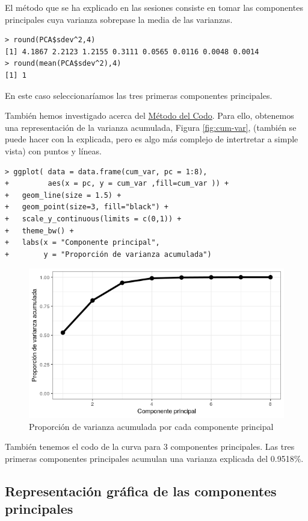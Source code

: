 \documentclass[12pt]{article}
\begin{document}
El método que se ha explicado en las sesiones consiste en tomar las
componentes principales cuya varianza sobrepase la media de las
varianzas.
\begin{verbatim}
> round(PCA$sdev^2,4)
[1] 4.1867 2.2123 1.2155 0.3111 0.0565 0.0116 0.0048 0.0014
> round(mean(PCA$sdev^2),4)
[1] 1
\end{verbatim}
En este caso seleccionaríamos las tres primeras componentes principales.

También hemos investigado acerca del
\href{https://en.wikipedia.org/wiki/Elbow_method_%28clustering%29}
  {Método del Codo}.
  Para ello, obtenemos una representación de la varianza acumulada,
  Figura \ref{fig:cum-var}, (también se puede hacer con la explicada,
  pero es algo más complejo de intertretar a simple vista) con puntos
  y líneas.
  \begin{verbatim}
> ggplot( data = data.frame(cum_var, pc = 1:8),
+         aes(x = pc, y = cum_var ,fill=cum_var )) +
+   geom_line(size = 1.5) +
+   geom_point(size=3, fill="black") +
+   scale_y_continuous(limits = c(0,1)) +
+   theme_bw() +
+   labs(x = "Componente principal",
+        y = "Proporción de varianza acumulada")
\end{verbatim}

\begin{figure}[H]
  \centering
  \includegraphics[width=120mm]{imgs/elbow}
  \caption{Proporción de varianza acumulada por cada componente principal}
  \label{fig:elbow}
\end{figure}

También tenemos el codo de la curva para 3 componentes
principales. Las tres primeras componentes principales acumulan una
varianza explicada del 0.9518\%.

\pagebreak

\subsection{Representación gráfica de las componentes principales}
\end{document}
